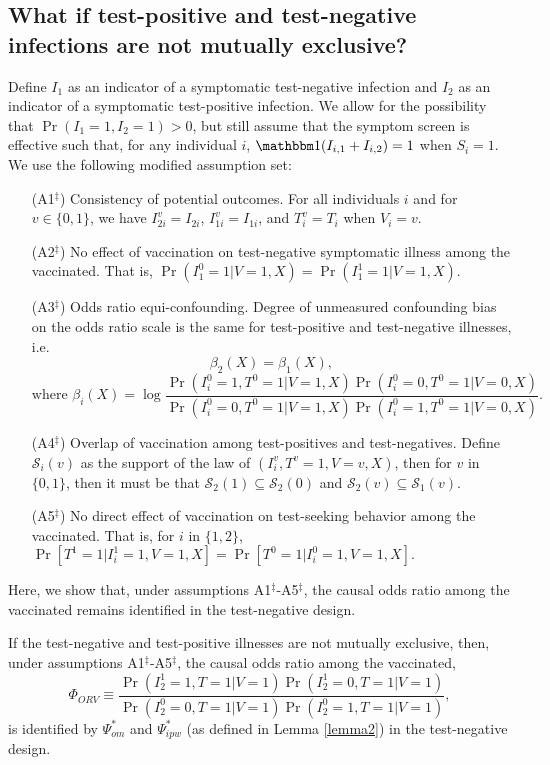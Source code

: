\begin{appendix}
\subsection{What if test-positive and test-negative infections are not mutually exclusive?}
Define $I_1$ as an indicator of a symptomatic test-negative infection and $I_2$ as an indicator of a symptomatic test-positive infection. We allow for the possibility that $\Pr(I_1 = 1, I_2 = 1) > 0$, but still assume that the symptom screen is effective such that, for any individual $i$, $\mathbbm 1(I_{i,1} + I_{i,2}) = 1$ when $S_i = 1$. We use the following modified assumption set:
\begin{itemize}
    \item[(A1$^\ddagger$)] Consistency of potential outcomes. For all individuals $i$ and for $v \in \{0, 1\}$, we have $I_{2i}^v = I_{2i}$, $I_{1i}^v = I_{1i}$, and $T_i^v = T_i$ when $V_i = v$.
    \item[(A2$^\ddagger$)] No effect of vaccination on test-negative symptomatic illness  among the vaccinated. That is, $\Pr(I_1^0 = 1 | V = 1, X) = \Pr(I_1^1 = 1 | V = 1, X).$
    \item[(A3$^\ddagger$)] Odds ratio equi-confounding. Degree of unmeasured confounding bias on the odds ratio scale is the same for test-positive and test-negative illnesses, i.e. 
        $$\beta_2(X) = \beta_1(X), $$
        $$ \text{where } \beta_i(X) = \log \frac{\Pr(I^0_i = 1, T^0 = 1 | V = 1, X)\Pr(I^0_i = 0, T^0 = 1 | V = 0, X)}{\Pr(I^0_i = 0, T^0 = 1 | V = 1, X)\Pr(I^0_i = 1, T^0 = 1| V = 0, X)}.$$
    \item[(A4$^\ddagger$)] Overlap of vaccination among test-positives and test-negatives. Define $\mathcal{S}_i(v)$ as the support of the law of $(I^v_i, T^v = 1, V = v, X)$, then for $v$ in $\{0,1\}$, then it must be that $\mathcal{S}_2(1) \subseteq \mathcal{S}_2(0)$ and $\mathcal{S}_2(v) \subseteq \mathcal{S}_1(v).$
    \item[(A5$^\ddagger$)] No direct effect of vaccination on test-seeking behavior among the vaccinated. That is, for $i$ in $\{1,2\}$, $\Pr[T^1 = 1 | I^1_i = 1, V = 1, X] = \Pr[T^0 = 1 | I^0_i = 1, V = 1, X].$
\end{itemize}

Here, we show that, under assumptions A1$^\ddagger$-A5$^\ddagger$, the causal odds ratio among the vaccinated remains identified in the test-negative design.

\begin{theorem}
    If the test-negative and test-positive illnesses are not mutually exclusive, then, under assumptions A1$^\ddagger$-A5$^\ddagger$, the causal odds ratio among the vaccinated, 
    \begin{equation*}
        \Phi_{ORV} \equiv \dfrac{\Pr(I^1_2=1, T = 1|V=1)\Pr(I^1_2=0, T = 1|V=1)}{\Pr(I^0_2=0, T = 1|V=1)\Pr(I^0_2=1, T = 1|V=1)},
    \end{equation*}
    is identified by $\Psi^*_{om}$ and $\Psi^*_{ipw}$ (as defined in Lemma \ref{lemma2}) in the test-negative design.
    \end{theorem}
    

\end{appendix}

